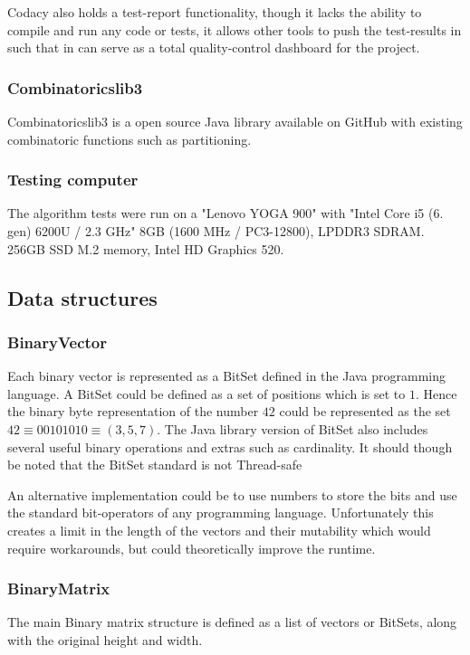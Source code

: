 \documentclass[a4paper]{article}
\begin{document}
Codacy also holds a test-report functionality, though it lacks the ability to compile
and run any code or tests, it allows other tools to push the test-results in such that
in can serve as a total quality-control dashboard for the project.

\subsubsection{Combinatoricslib3}
Combinatoricslib3 is a open source Java library available on GitHub with existing
combinatoric functions such as partitioning.

\subsubsection{Testing computer}
The algorithm tests were run on a "Lenovo YOGA 900" with "Intel Core i5 (6. gen) 6200U / 2.3 GHz"
8GB (1600 MHz / PC3-12800), LPDDR3 SDRAM. 256GB SSD M.2 memory, Intel HD Graphics 520.

\subsection{Data structures}
\subsubsection{BinaryVector}
Each binary vector is represented as a BitSet defined in the Java programming language. A
BitSet could be defined as a set of positions which is set to $1$. Hence the binary byte
representation of the number $42$ could be represented as the set
$42 \equiv 00101010 \equiv (3,5,7)$. The Java library version of BitSet also includes several
useful binary operations and extras such as cardinality. It should though be noted that the
BitSet standard is not Thread-safe \cite{bitset_java_14_2020}


An alternative implementation could be to use numbers to store the bits and use the standard
bit-operators of any programming language. Unfortunately this creates a limit in the length
of the vectors and their mutability which would require workarounds, but could theoretically
improve the runtime.

\subsubsection{BinaryMatrix}
The main Binary matrix structure is defined as a list of vectors or BitSets, along with the
original height and width.
\end{document}

